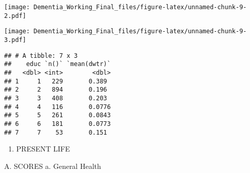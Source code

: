 \documentclass[]{article}
\newenvironment{Shaded}{\begin{snugshade}}{\end{snugshade}}
\newcommand{\DecValTok}[1]{\textcolor[rgb]{0.00,0.00,0.81}{#1}}
\newcommand{\KeywordTok}[1]{\textcolor[rgb]{0.13,0.29,0.53}{\textbf{#1}}}
\newcommand{\NormalTok}[1]{#1}
\newcommand{\OperatorTok}[1]{\textcolor[rgb]{0.81,0.36,0.00}{\textbf{#1}}}
\newcommand{\StringTok}[1]{\textcolor[rgb]{0.31,0.60,0.02}{#1}}
\providecommand{\tightlist}{%
  \setlength{\itemsep}{0pt}\setlength{\parskip}{0pt}}
\begin{document}
\texttt{[image: Dementia\_Working\_Final\_files/figure-latex/unnamed-chunk-9-2.pdf]}

\begin{Shaded}
\end{Shaded}

\texttt{[image: Dementia\_Working\_Final\_files/figure-latex/unnamed-chunk-9-3.pdf]}

\begin{Shaded}
\end{Shaded}

\begin{verbatim}
## # A tibble: 7 x 3
##    educ `n()` `mean(dwtr)`
##   <dbl> <int>        <dbl>
## 1     1   229       0.389 
## 2     2   894       0.196 
## 3     3   408       0.203 
## 4     4   116       0.0776
## 5     5   261       0.0843
## 6     6   181       0.0773
## 7     7    53       0.151
\end{verbatim}

\begin{enumerate}
\def\labelenumi{\Roman{enumi}.}
\setcounter{enumi}{1}
\tightlist
\item
  PRESENT LIFE
\end{enumerate}

A. SCORES a. General Health
\end{document}
